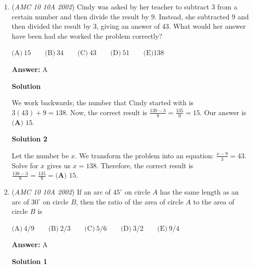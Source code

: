 \begin{enumerate}
$\text{(A)}\ \pi \qquad \text{(B)}\ 1.5\pi \qquad \text{(C)}\ 2\pi \qquad \text{(D)}\ 3\pi \qquad \text{(E)}\ 3.5\pi$

 \textbf{Answer: }C



\textbf{Solution}

The outer circle has radius $1+1+1=3$, and thus area $9\pi$. The little circles have area $\pi$ each; since there are 7, their total area is $7\pi$. Thus, our answer is $9\pi-7\pi=\boxed{2\pi\Rightarrow \textbf{(C)}}$.

 


	\item (\textit{AMC 10 10A 2002}) Cindy was asked by her teacher to subtract $3$ from a certain number and then divide the result by $9$. Instead, she subtracted $9$ and then divided the result by $3$, giving an answer of $43$. What would her answer have been had she worked the problem correctly?


 $\text{(A)}\ 15 \qquad \text{(B)}\ 34 \qquad \text{(C)}\ 43 \qquad \text{(D)}\ 51 \qquad \text{(E)} 138$

 \textbf{Answer: }A



\textbf{Solution}

We work backwards; the number that Cindy started with is $3(43)+9=138$. Now, the correct result is $\frac{138-3}{9}=\frac{135}{9}=15$. Our answer is $\boxed{\textbf{(A) }15}$.

 


 



\textbf{Solution 2}

Let the number be $x$. We transform the problem into an equation: $\frac{x-9}{3}=43$. Solve for $x$ gives us $x=138$. Therefore, the correct result is $\frac{138-3}{9}=\frac{135}{9}=\boxed{\textbf{(A) }15}$.

 


	\item (\textit{AMC 10 10A 2002}) If an arc of $45^\circ$ on circle $A$ has the same length as an arc of $30^\circ$ on circle $B$, then the ratio of the area of circle $A$ to the area of circle $B$ is


 $\text{(A)}\ 4/9 \qquad \text{(B)}\ 2/3 \qquad \text{(C)}\ 5/6 \qquad \text{(D)}\ 3/2 \qquad \text{(E)}\ 9/4$

 \textbf{Answer: }A



\textbf{Solution 1}


\end{enumerate}

